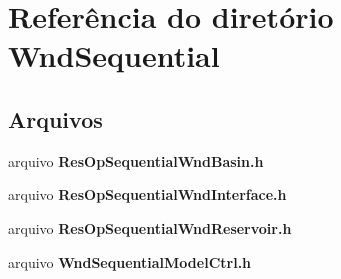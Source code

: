 \section{Referência do diretório Wnd\+Sequential}
\label{dir_c4e1f765b8c97a268b493863d997e3a4}
\subsection*{Arquivos}
\begin{DoxyCompactItemize}
\item 
arquivo {\bf Res\+Op\+Sequential\+Wnd\+Basin.\+h}
\item 
arquivo {\bf Res\+Op\+Sequential\+Wnd\+Interface.\+h}
\item 
arquivo {\bf Res\+Op\+Sequential\+Wnd\+Reservoir.\+h}
\item 
arquivo {\bf Wnd\+Sequential\+Model\+Ctrl.\+h}
\end{DoxyCompactItemize}
